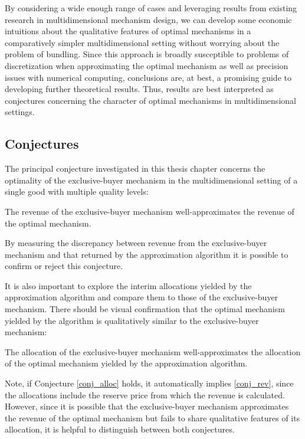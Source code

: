 \noindent By considering a wide enough range of cases and leveraging results from existing research in multidimensional mechanism design, we can develop some economic intuitions about the qualitative features of optimal mechanisms in a comparatively simpler multidimensional setting without worrying about the problem of bundling. Since this approach is broadly susceptible to problems of discretization when approximating the optimal mechanism as well as precision issues with numerical computing, conclusions are, at best, a promising guide to developing further theoretical results. Thus, results are best interpreted as conjectures concerning the character of optimal mechanisms in multidimensional settings.




\subsection{Conjectures}\label{subsec_conj}

The principal conjecture investigated in this thesis chapter concerns the optimality of the exclusive-buyer mechanism in the multidimensional setting of a single good with multiple quality levels:

\begin{conjecture}[Revenue]\label{conj_rev}
The revenue of the exclusive-buyer mechanism well-approximates the revenue of the optimal mechanism.
\end{conjecture}

\noindent By measuring the discrepancy between revenue from the exclusive-buyer mechanism and that returned by the approximation algorithm it is possible to confirm or reject this conjecture. 

It is also important to explore the interim allocations yielded by the approximation algorithm and compare them to those of the exclusive-buyer mechanism. There should be visual confirmation that the optimal mechanism yielded by the algorithm is qualitatively similar to the exclusive-buyer mechanism:

\begin{conjecture}[Allocations]\label{conj_alloc}
The allocation of the exclusive-buyer mechanism well-approximates the allocation of the optimal mechanism yielded by the approximation algorithm.
\end{conjecture}

\noindent Note, if Conjecture \ref{conj_alloc} holds, it automatically implies \ref{conj_rev}, since the allocations include the reserve price from which the revenue is calculated. However, since it is possible that the exclusive-buyer mechanism approximates the revenue of the optimal mechanism but fails to share qualitative features of its allocation, it is helpful to distinguish between both conjectures.

